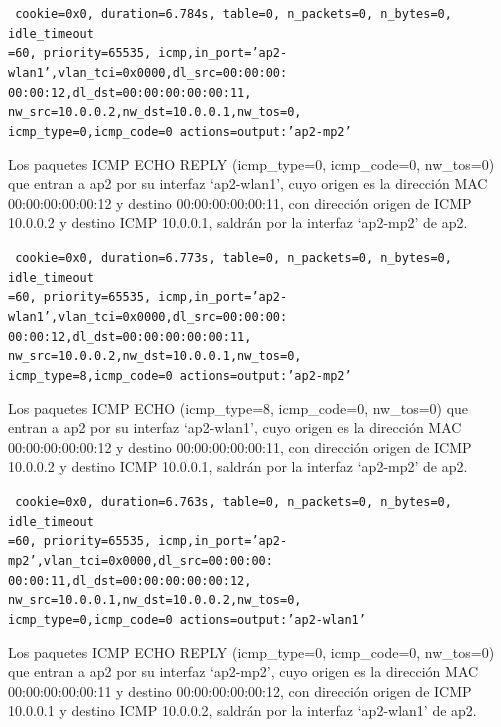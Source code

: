 \documentclass[a4paper,12pt,twoside,spanish]{book}
\begin{document}
\noindent\texttt{
	cookie=0x0, duration=6.784s, table=0, n\_packets=0, n\_bytes=0, idle\_timeout\\
	=60, priority=65535,
	icmp,in\_port='ap2-wlan1',vlan\_tci=0x0000,dl\_src=00:00:00:\\
	00:00:12,dl\_dst=00:00:00:00:00:11,
	nw\_src=10.0.0.2,nw\_dst=10.0.0.1,nw\_tos=0,\\
	icmp\_type=0,icmp\_code=0 actions=output:'ap2-mp2'
}

Los paquetes ICMP ECHO REPLY (icmp\_type=0, icmp\_code=0, nw\_tos=0) que entran a ap2 por su interfaz ‘ap2-wlan1’, cuyo origen es la dirección MAC 00:00:00:00:00:12 y destino 00:00:00:00:00:11, con dirección origen de ICMP 10.0.0.2 y destino ICMP 10.0.0.1, saldrán por la interfaz ‘ap2-mp2’ de ap2.\par 

\noindent\texttt{
	cookie=0x0, duration=6.773s, table=0, n\_packets=0, n\_bytes=0, idle\_timeout\\
	=60, priority=65535,
	icmp,in\_port='ap2-wlan1',vlan\_tci=0x0000,dl\_src=00:00:00:\\
	00:00:12,dl\_dst=00:00:00:00:00:11,
	nw\_src=10.0.0.2,nw\_dst=10.0.0.1,nw\_tos=0,\\
	icmp\_type=8,icmp\_code=0 actions=output:'ap2-mp2'
}

Los paquetes ICMP ECHO (icmp\_type=8, icmp\_code=0, nw\_tos=0) que entran a ap2 por su interfaz ‘ap2-wlan1’, cuyo origen es la dirección MAC 00:00:00:00:00:12 y destino 00:00:00:00:00:11, con dirección origen de ICMP 10.0.0.2 y destino ICMP 10.0.0.1, saldrán por la interfaz ‘ap2-mp2’ de ap2.\par 

\noindent\texttt{
	cookie=0x0, duration=6.763s, table=0, n\_packets=0, n\_bytes=0, idle\_timeout\\
	=60, priority=65535,
	icmp,in\_port='ap2-mp2',vlan\_tci=0x0000,dl\_src=00:00:00:\\
	00:00:11,dl\_dst=00:00:00:00:00:12,
	nw\_src=10.0.0.1,nw\_dst=10.0.0.2,nw\_tos=0,\\
	icmp\_type=0,icmp\_code=0 actions=output:'ap2-wlan1'
}

Los paquetes ICMP ECHO REPLY (icmp\_type=0, icmp\_code=0, nw\_tos=0) que entran a ap2 por su interfaz ‘ap2-mp2’, cuyo origen es la dirección MAC 00:00:00:00:00:11 y destino 00:00:00:00:00:12, con dirección origen de ICMP 10.0.0.1 y destino ICMP 10.0.0.2, saldrán por la interfaz ‘ap2-wlan1’ de ap2.\par 
\end{document}
